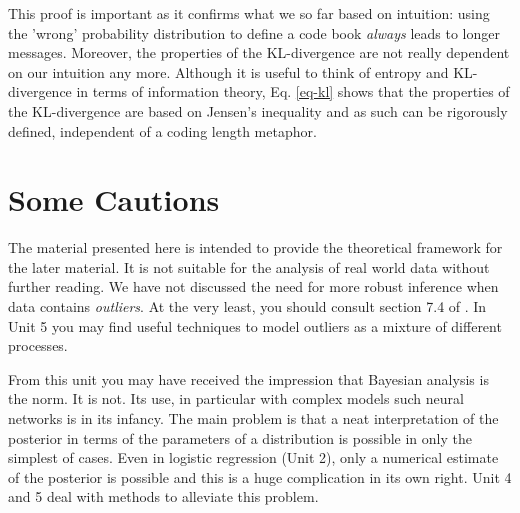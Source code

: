 This proof is important as it confirms what we so far based on intuition: using the 'wrong' probability distribution to define a code book
\emph{always} leads to longer messages. Moreover, the properties of the KL-divergence are not really dependent on our intuition any more.
Although it is useful to think of entropy and KL-divergence in terms of information theory, Eq. \ref{eq-kl} shows that the properties
of the KL-divergence are based on Jensen's inequality and as such can be rigorously defined, independent of a coding length metaphor.


\chapter{Some Cautions}
The material presented here is intended to provide the theoretical framework
for the later material. It is not suitable for the analysis of real world data without
further reading. We have not discussed the need for more robust inference
when data contains \emph{outliers}. At the very least, you should consult
section 7.4 of \cite{murphy2012}. In Unit 5 you may find useful techniques
to model outliers as a mixture of different processes.

From this unit you may have received the impression that Bayesian analysis is the
norm. It is not. Its use, in particular with complex models such neural networks
is in its infancy. The main problem is that a neat interpretation of the posterior
in terms of the parameters of a distribution is possible in only the simplest
of cases. Even in logistic regression (Unit 2), only a numerical
estimate of the posterior is possible and this is a huge complication in its
own right. Unit 4 and 5 deal with methods to alleviate this problem.


  
  


  


